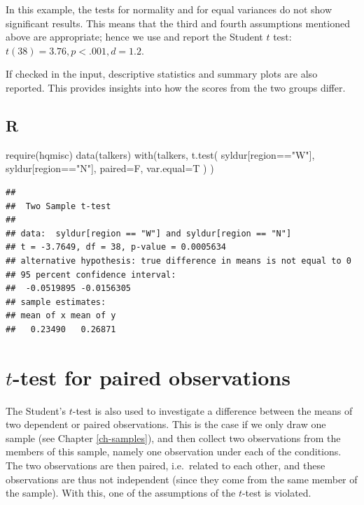 \documentclass[
]{book}
\newenvironment{Shaded}{\begin{snugshade}}{\end{snugshade}}
\newcommand{\AttributeTok}[1]{\textcolor[rgb]{0.77,0.63,0.00}{#1}}
\newcommand{\FunctionTok}[1]{\textcolor[rgb]{0.00,0.00,0.00}{#1}}
\newcommand{\NormalTok}[1]{#1}
\newcommand{\SpecialCharTok}[1]{\textcolor[rgb]{0.00,0.00,0.00}{#1}}
\newcommand{\StringTok}[1]{\textcolor[rgb]{0.31,0.60,0.02}{#1}}
\begin{document}
In this example, the tests for normality and for equal variances do not show significant results. This means that the third and fourth assumptions mentioned above are appropriate; hence we use and report the Student \(t\) test: \(t(38)=3.76, p<.001, d=1.2\).

If checked in the input, descriptive statistics and summary plots are also reported. This provides insights into how the scores from the two groups differ.

\hypertarget{sec:R-ttest-unpaired}{%
\subsection{R}\label{sec:R-ttest-unpaired}}

\begin{Shaded}
\begin{Highlighting}[]
\FunctionTok{require}\NormalTok{(hqmisc)}
\FunctionTok{data}\NormalTok{(talkers)}
\FunctionTok{with}\NormalTok{(talkers, }\FunctionTok{t.test}\NormalTok{( syldur[region}\SpecialCharTok{==}\StringTok{"W"}\NormalTok{], syldur[region}\SpecialCharTok{==}\StringTok{"N"}\NormalTok{], }
            \AttributeTok{paired=}\NormalTok{F, }\AttributeTok{var.equal=}\NormalTok{T ) )}
\end{Highlighting}
\end{Shaded}

\begin{verbatim}
## 
##  Two Sample t-test
## 
## data:  syldur[region == "W"] and syldur[region == "N"]
## t = -3.7649, df = 38, p-value = 0.0005634
## alternative hypothesis: true difference in means is not equal to 0
## 95 percent confidence interval:
##  -0.0519895 -0.0156305
## sample estimates:
## mean of x mean of y 
##   0.23490   0.26871
\end{verbatim}

\hypertarget{sec:ttest-paired}{%
\section{\texorpdfstring{\(t\)-test for paired observations}{t-test for paired observations}}\label{sec:ttest-paired}}

The Student's \(t\)-test is also used to investigate a difference between the
means of two dependent or paired observations. This is the case if we only draw
one sample (see Chapter \ref{ch-samples}), and then collect two observations
from the members of this sample,
namely one observation under each of the conditions. The two
observations are then paired, i.e.~related to each other,
and these observations are thus not independent (since they come
from the same member of the sample). With this, one of the assumptions of
the \(t\)-test is violated.
\end{document}
